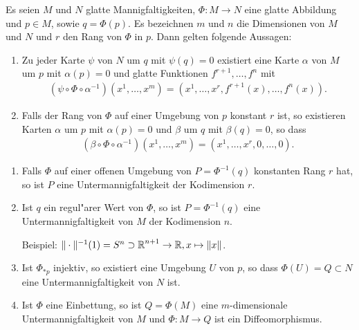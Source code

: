 \begin{Satz}\label{satz-3-4}
  Es seien $M$ und $N$ glatte Mannigfaltigkeiten, $\Phi \colon M \to N$ eine glatte Abbildung und $p \in M$, sowie $q = \Phi(p)$. Es bezeichnen $m$ und $n$ die Dimensionen von $M$ und $N$ und $r$ den Rang von $\Phi$ in $p$. Dann gelten folgende Aussagen:
  \begin{enumerate}[label=(\roman*),leftmargin=*,widest=ii]
  \item Zu jeder Karte $\psi$ von $N$ um $q$ mit $\psi(q) = 0$ existiert eine Karte $\alpha$ von $M$ um $p$ mit $\alpha(p) = 0$ und glatte Funktionen $f^{r+1},\ldots,f^n$ mit
    \begin{align*}
      \left(\psi \circ \Phi \circ \alpha^{-1}\right)\left(x^1,\ldots, x^m\right) = \left(x^1, \ldots, x^{r}, f^{r+1}(x), \ldots, f^n(x)\right).
    \end{align*}
  \item Falls der Rang von $\Phi$ auf einer Umgebung von $p$ konstant $r$ ist, so existieren Karten $\alpha$ um $p$ mit $\alpha(p) = 0$ und $\beta$ um $q$ mit $\beta(q) = 0$, so dass
    \begin{align*}
      \left(\beta \circ \Phi \circ \alpha^{-1}\right)\left(x^1, \ldots, x^m\right) = \left(x^1, \ldots, x^r, 0, \ldots, 0\right).
    \end{align*}
  \end{enumerate}
\end{Satz} 

\begin{Kor}
  \begin{enumerate}[label=(\roman*),widest=iii,leftmargin=*]
  \item Falls $\Phi$ auf einer offenen Umgebung von $P = \Phi^{-1}(q)$ konstanten Rang $r$ hat, so ist $P$ eine Untermannigfaltigkeit der Kodimension $r$.
  \item Ist $q$ ein regul"arer Wert von $\Phi$, so ist $P = \Phi^{-1}(q)$ eine Untermannigfaltigkeit von $M$ der Kodimension $n$.
  
    Beispiel: $\|\cdot\|^{-1}(1) = S^n \supset \operatorname{\mathbb{R}}^{n+1} \to \operatorname{\mathbb{R}}, x \mapsto \|x\|$.
  \item Ist $\Phi_{*p}$ injektiv, so existiert eine Umgebung $U$ von $p$, so dass $\Phi(U) = Q \subset N$ eine Untermannigfaltigkeit von $N$ ist.
  \item Ist $\Phi$ eine Einbettung, so ist $Q = \Phi(M)$ eine $m$-dimensionale Untermannigfaltigkeit von $M$ und $\Phi \colon M \to Q$ ist ein Diffeomorphismus.
  \end{enumerate}
\end{Kor}

